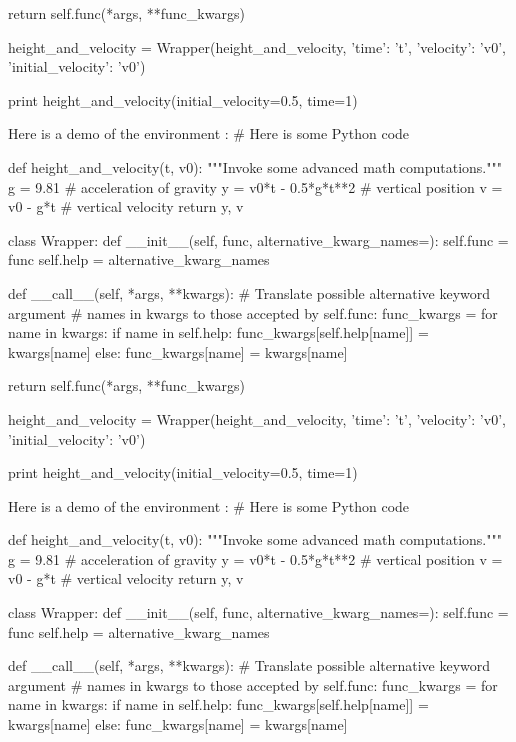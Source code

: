         return self.func(*args, **func_kwargs)

height_and_velocity = Wrapper(height_and_velocity,
                              {'time': 't',
                               'velocity': 'v0',
                               'initial_velocity': 'v0'})

print height_and_velocity(initial_velocity=0.5, time=1)


\noindent
Here is a demo of the environment :
# Here is some Python code

def height_and_velocity(t, v0):
    """Invoke some advanced math computations."""
    g = 9.81                  # acceleration of gravity
    y = v0*t - 0.5*g*t**2     # vertical position
    v = v0 - g*t              # vertical velocity
    return y, v

class Wrapper:
    def __init__(self, func, alternative_kwarg_names={}):
        self.func = func
        self.help = alternative_kwarg_names

    def __call__(self, *args, **kwargs):
        # Translate possible alternative keyword argument
        # names in kwargs to those accepted by self.func:
        func_kwargs = {}
        for name in kwargs:
            if name in self.help:
                func_kwargs[self.help[name]] = kwargs[name]
            else:
                func_kwargs[name] = kwargs[name]

        return self.func(*args, **func_kwargs)

height_and_velocity = Wrapper(height_and_velocity,
                              {'time': 't',
                               'velocity': 'v0',
                               'initial_velocity': 'v0'})

print height_and_velocity(initial_velocity=0.5, time=1)


\noindent
Here is a demo of the environment :
# Here is some Python code

def height_and_velocity(t, v0):
    """Invoke some advanced math computations."""
    g = 9.81                  # acceleration of gravity
    y = v0*t - 0.5*g*t**2     # vertical position
    v = v0 - g*t              # vertical velocity
    return y, v

class Wrapper:
    def __init__(self, func, alternative_kwarg_names={}):
        self.func = func
        self.help = alternative_kwarg_names

    def __call__(self, *args, **kwargs):
        # Translate possible alternative keyword argument
        # names in kwargs to those accepted by self.func:
        func_kwargs = {}
        for name in kwargs:
            if name in self.help:
                func_kwargs[self.help[name]] = kwargs[name]
            else:
                func_kwargs[name] = kwargs[name]

